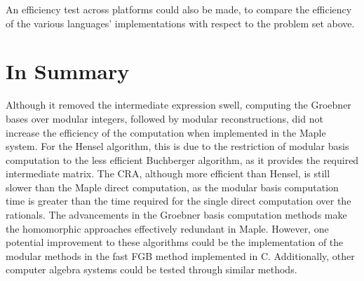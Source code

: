 \documentclass[letterpaper,12pt,titlepage,oneside,final]{book}
\begin{document}
An efficiency test across platforms could also be made, to compare the efficiency of the various languages' implementations with respect to the problem set above.


\section{In Summary}

Although it removed the intermediate expression swell, computing the Groebner bases over modular integers, followed by modular reconstructions, did not increase the efficiency of the computation when implemented in the Maple system.  For the Hensel algorithm, this is due to the restriction of modular basis computation to the less efficient Buchberger algorithm, as it provides the required intermediate matrix.  The CRA, although more efficient than Hensel, is still slower than the Maple direct computation, as the modular basis computation time is greater than the time required for the single direct computation over the rationals.  The advancements in the Groebner basis computation methods make the homomorphic approaches effectively redundant in Maple.  However, one potential improvement to these algorithms could be the implementation of the modular methods in the fast FGB method implemented in C.  Additionally, other computer algebra systems could be tested through similar methods. 
\end{document}
